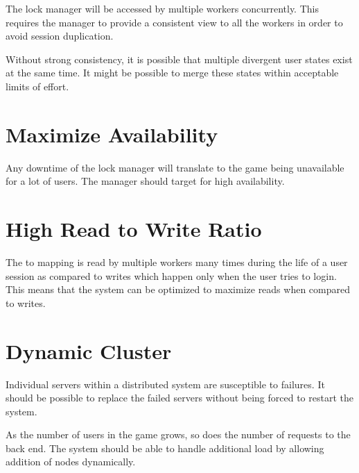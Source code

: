 
The lock manager will be accessed by multiple workers concurrently. This
requires the manager to provide a consistent view to all the workers in
order to avoid session duplication.

Without strong consistency, it is possible that multiple divergent user states
exist at the same time. It might be possible to merge these states within
acceptable limits of effort.

\section{Maximize Availability}


Any downtime of the lock manager will translate to the game being unavailable
for a lot of users. The manager should target for high availability.

\section{High Read to Write Ratio}
\label{section:req.read.write.ratio}


The  to  mapping is read by multiple workers many times
during the life
of a user session as compared to writes which happen only when the user tries
to login. This means that the system can be optimized to maximize reads when
compared to writes.

\section{Dynamic Cluster}
\label{section:req.dynamic.cluster}


Individual servers within a distributed system are susceptible to failures.
It should be possible to replace the failed servers without being forced
to restart the system.

As the number of users in the game grows, so does the number of requests to
the back end. The system should be able to handle additional load by allowing
addition of nodes dynamically.


